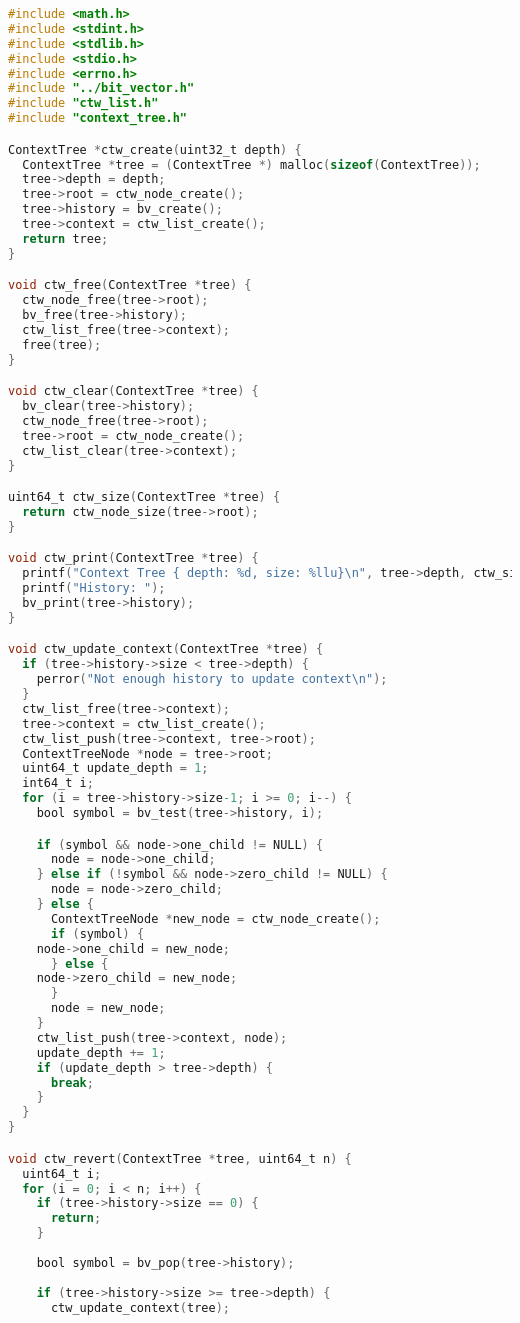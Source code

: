 \documentclass[fancychapters]{report}   	%
\begin{document}
\begin{lstlisting}[language=C,caption={context_tree.c}]
#include <math.h>
#include <stdint.h>
#include <stdlib.h>
#include <stdio.h>
#include <errno.h>
#include "../bit_vector.h"
#include "ctw_list.h"
#include "context_tree.h"

ContextTree *ctw_create(uint32_t depth) {
  ContextTree *tree = (ContextTree *) malloc(sizeof(ContextTree));
  tree->depth = depth;
  tree->root = ctw_node_create();
  tree->history = bv_create();
  tree->context = ctw_list_create();
  return tree;
}

void ctw_free(ContextTree *tree) {
  ctw_node_free(tree->root);
  bv_free(tree->history);
  ctw_list_free(tree->context);
  free(tree);
}

void ctw_clear(ContextTree *tree) {
  bv_clear(tree->history);
  ctw_node_free(tree->root);
  tree->root = ctw_node_create();
  ctw_list_clear(tree->context);
}

uint64_t ctw_size(ContextTree *tree) {
  return ctw_node_size(tree->root);
}

void ctw_print(ContextTree *tree) {
  printf("Context Tree { depth: %d, size: %llu}\n", tree->depth, ctw_size(tree));
  printf("History: ");
  bv_print(tree->history);
}

void ctw_update_context(ContextTree *tree) {
  if (tree->history->size < tree->depth) {
    perror("Not enough history to update context\n");
  }
  ctw_list_free(tree->context);
  tree->context = ctw_list_create();
  ctw_list_push(tree->context, tree->root);
  ContextTreeNode *node = tree->root;
  uint64_t update_depth = 1;
  int64_t i;
  for (i = tree->history->size-1; i >= 0; i--) {
    bool symbol = bv_test(tree->history, i);

    if (symbol && node->one_child != NULL) {
      node = node->one_child;
    } else if (!symbol && node->zero_child != NULL) {
      node = node->zero_child;
    } else {
      ContextTreeNode *new_node = ctw_node_create();
      if (symbol) {
	node->one_child = new_node;
      } else {
	node->zero_child = new_node;
      }
      node = new_node;
    }
    ctw_list_push(tree->context, node);
    update_depth += 1;
    if (update_depth > tree->depth) {
      break;
    }
  }
}

void ctw_revert(ContextTree *tree, uint64_t n) {
  uint64_t i;
  for (i = 0; i < n; i++) {
    if (tree->history->size == 0) {
      return;
    }
    
    bool symbol = bv_pop(tree->history);
    
    if (tree->history->size >= tree->depth) {
      ctw_update_context(tree);
      

\end{lstlisting}
\end{document}
